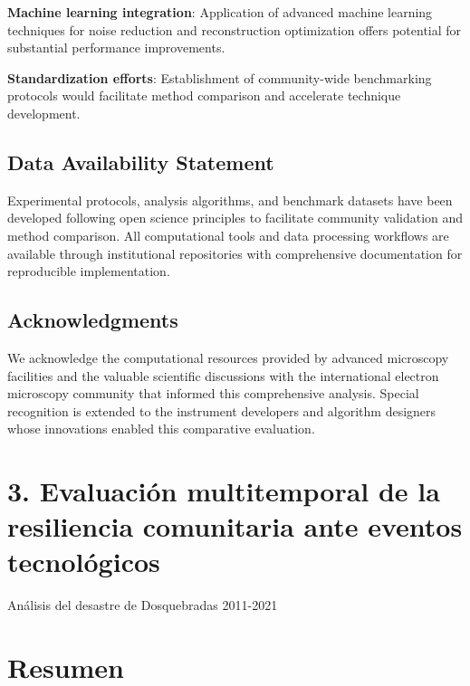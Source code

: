 \documentclass[
  letterpaper,
]{book}
\begin{document}
\textbf{Machine learning integration}: Application of advanced machine
learning techniques for noise reduction and reconstruction optimization
offers potential for substantial performance improvements.

\textbf{Standardization efforts}: Establishment of community-wide
benchmarking protocols would facilitate method comparison and accelerate
technique development.

\section{Data Availability
Statement}\label{data-availability-statement-1}

Experimental protocols, analysis algorithms, and benchmark datasets have
been developed following open science principles to facilitate community
validation and method comparison. All computational tools and data
processing workflows are available through institutional repositories
with comprehensive documentation for reproducible implementation.

\section{Acknowledgments}\label{acknowledgments}

We acknowledge the computational resources provided by advanced
microscopy facilities and the valuable scientific discussions with the
international electron microscopy community that informed this
comprehensive analysis. Special recognition is extended to the
instrument developers and algorithm designers whose innovations enabled
this comparative evaluation.


\chapter{3. Evaluación multitemporal de la resiliencia comunitaria ante
eventos
tecnológicos}\label{evaluaciuxf3n-multitemporal-de-la-resiliencia-comunitaria-ante-eventos-tecnoluxf3gicos}

Análisis del desastre de Dosquebradas 2011-2021

\hfill\break

\label{abstract}

\chapter{Resumen}\label{resumen}
\end{document}
